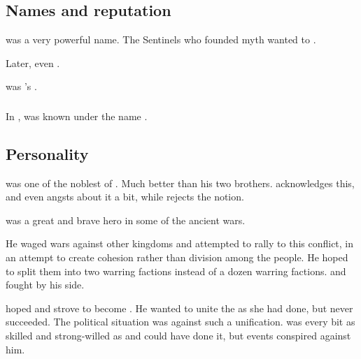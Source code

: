 \subsection{Names and reputation}
\quo{\Nexagglachel} was a very powerful name. 
The Sentinels who founded \Ortaican myth wanted to . 

Later, \Secherdamon even .

\quo{\Khivaash} was \Nexagglachel's . 




\subsubsection{\Mezzagrael}
In , \Nexagglachel was known under the name . 









\subsection{Personality}
\Nexagglachel{} was one of the noblest of \dragons. Much better than his two brothers. \Ishnaruchaefir{} acknowledges this, and even angsts about it a bit, while \Secherdamon{} rejects the notion. 

\Nexagglachel{} was a great and brave hero in some of the ancient wars. 

He waged wars against other \draconian{} kingdoms and attempted to rally \dragons{} to this conflict, in an attempt to create cohesion rather than division among the \draconian{} people. He hoped to split them into two warring factions instead of a dozen warring factions. \Ishnaruchaefir{} and \Secherdamon{} fought by his side. 

\Nexagglachel{} hoped and strove to become . 
He wanted to unite the \dzraicchenosses{} as she had done, but never succeeded. 
The political situation was against such a unification. 
\Nexagglachel{} was every bit as skilled and strong-willed as \Kserasshana{} and could have done it, but events conspired against him. 









